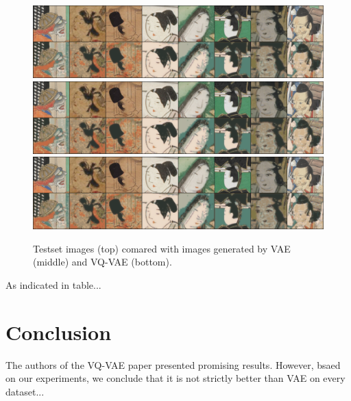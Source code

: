 \documentclass{article}
\begin{document}
\begin{figure}[t]
    \centering
    \includegraphics[trim=0 9cm 0 0, clip, width=.8\linewidth]{generation_sample.png}
    \includegraphics[trim=0 0 0 9cm, clip, width=.8\linewidth]{generation_sample.png}
    \includegraphics[trim=0 0 0 9cm, clip, width=.8\linewidth]{generation_sample.png}
    \caption{Testset images (top) comared with images generated by VAE (middle) and VQ-VAE (bottom).}
\end{figure}

As indicated in table...

\section{Conclusion}

The authors of the VQ-VAE paper presented promising results. However, bsaed on our experiments, we conclude that it is not strictly better than VAE on every dataset...
\end{document}
